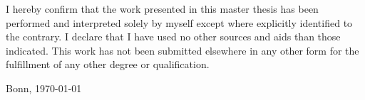 I hereby confirm that the work presented in this master thesis has been performed and interpreted solely by myself except where explicitly identified to the contrary. I declare that I have used no other sources and 
aids than those indicated. This work has not been submitted elsewhere in any other form for the fulfillment of any other degree or qualification.

\vspace*{3cm}
\par\noindent%
Bonn, \today \hfill \underline{\hspace*{5.5cm}}
\vspace*{\fill}